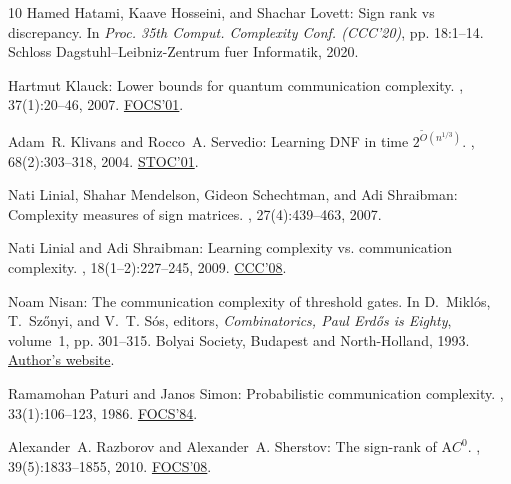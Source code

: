 \begin{thebibliography}{10}
{\sc Hamed Hatami, Kaave Hosseini, and Shachar Lovett}: Sign rank vs
  discrepancy.
\newblock In {\em Proc. 35th Comput. Complexity Conf. (CCC'20)}, pp. 18:1--14.
  Schloss Dagstuhl--Leibniz-Zentrum fuer Informatik, 2020.

{\sc Hartmut Klauck}: Lower bounds for quantum communication complexity.
, 37(1):20--46, 2007.
\newblock \prelim \href{https://doi.org/10.1109/SFCS.2001.959903}{FOCS'01}.
\newblock [\epfmtdoi{10.1137/S0097539702405620}]

{\sc Adam~R. Klivans and Rocco~A. Servedio}: Learning {DNF} in time
  {$2^{\tilde{O}(n^{1/3})}$}.
, 68(2):303--318, 2004.
\newblock \prelim \href{https://doi.org/10.1145/380752.380809}{STOC'01}.

{\sc Nati Linial, Shahar Mendelson, Gideon Schechtman, and Adi Shraibman}:
  Complexity measures of sign matrices.
, 27(4):439--463, 2007.
\newblock [\epfmtdoi{10.1007/s00493-007-2160-5}]

{\sc Nati Linial and Adi Shraibman}: Learning complexity vs. communication
  complexity.
, 18(1--2):227--245, 2009.
\newblock \prelim \href{https://doi.org/10.1109/CCC.2008.28}{CCC'08}.
\newblock [\epfmtdoi{10.1017/S0963548308009656}]

{\sc Noam Nisan}: The communication complexity of threshold gates.
\newblock In {\sc D.~Mikl\'os, T.~Sz\H{o}nyi, and V.~T. S\'os}, editors, {\em
  Combinatorics, Paul Erd\H{o}s is Eighty}, volume~1, pp. 301--315. Bolyai
  Society, Budapest and North-Holland, 1993.
\newblock
  \href{https://www.cs.huji.ac.il/~noam/publications/cc-thrshold.pdf}{Author's
  website}.

{\sc Ramamohan Paturi and Janos Simon}: Probabilistic communication complexity.
, 33(1):106--123, 1986.
\newblock \prelim \href{https://doi.org/10.1109/SFCS.1984.715908}{FOCS'84}.
\newblock [\epfmtdoi{10.1016/0022-0000(86)90046-2}]

{\sc Alexander~A. Razborov and Alexander~A. Sherstov}: The sign-rank of
  {$\mathrm AC^0$}.
, 39(5):1833--1855, 2010.
\newblock \prelim \href{https://doi.org/10.1109/FOCS.2008.19}{FOCS'08}.


\end{thebibliography}
